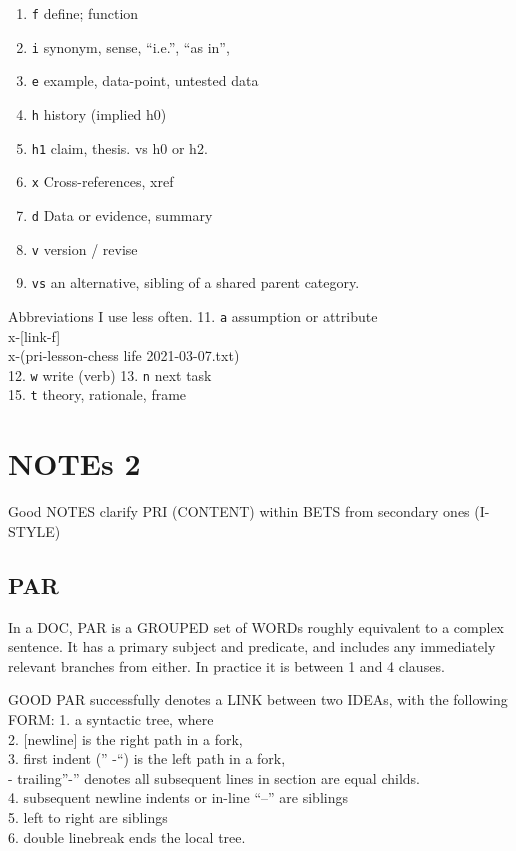 \documentclass[
]{book}
\begin{document}
\begin{enumerate}
\def\labelenumi{\arabic{enumi}.}
\item
  \texttt{f} define; function\\
\item
  \texttt{i} synonym, sense, ``i.e.'', ``as in'',\\
\item
  \texttt{e} example, data-point, untested data\\
\item
  \texttt{h} history (implied h0)
\item
  \texttt{h1} claim, thesis. vs h0 or h2.
\item
  \texttt{x} Cross-references, xref\\
\item
  \texttt{d} Data or evidence, summary
\item
  \texttt{v} version / revise\\
\item
  \texttt{vs} an alternative, sibling of a shared parent category.
\end{enumerate}

Abbreviations I use less often.
11. \texttt{a} assumption or attribute\\
x-{[}link-f{]}\\
x-(pri-lesson-chess life 2021-03-07.txt)\\
12. \texttt{w} write (verb)
13. \texttt{n} next task\\
15. \texttt{t} theory, rationale, frame

\hypertarget{notes-2}{%
\section{NOTEs 2}\label{notes-2}}

Good NOTES clarify PRI (CONTENT) within BETS from secondary ones (I-STYLE)

\hypertarget{par}{%
\subsection{PAR}\label{par}}

In a DOC, PAR is a GROUPED set of WORDs roughly equivalent to a complex sentence. It has a primary subject and predicate, and includes any immediately relevant branches from either. In practice it is between 1 and 4 clauses.

GOOD PAR successfully denotes a LINK between two IDEAs, with the following FORM:
1. a syntactic tree, where\\
2. {[}newline{]} is the right path in a fork,\\
3. first indent ('' -``) is the left path in a fork,\\
- trailing''-'' denotes all subsequent lines
in section are equal childs.\\
4. subsequent newline indents or in-line ``--'' are siblings\\
5. left to right are siblings\\
6. double linebreak ends the local tree.
\end{document}
